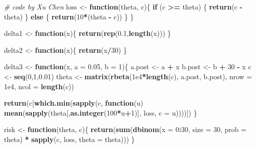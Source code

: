 \documentclass[
]{article}
\newenvironment{Shaded}{\begin{snugshade}}{\end{snugshade}}
\newcommand{\CommentTok}[1]{\textcolor[rgb]{0.56,0.35,0.01}{\textit{#1}}}
\newcommand{\ControlFlowTok}[1]{\textcolor[rgb]{0.13,0.29,0.53}{\textbf{#1}}}
\newcommand{\DataTypeTok}[1]{\textcolor[rgb]{0.13,0.29,0.53}{#1}}
\newcommand{\DecValTok}[1]{\textcolor[rgb]{0.00,0.00,0.81}{#1}}
\newcommand{\FloatTok}[1]{\textcolor[rgb]{0.00,0.00,0.81}{#1}}
\newcommand{\KeywordTok}[1]{\textcolor[rgb]{0.13,0.29,0.53}{\textbf{#1}}}
\newcommand{\NormalTok}[1]{#1}
\newcommand{\OperatorTok}[1]{\textcolor[rgb]{0.81,0.36,0.00}{\textbf{#1}}}
\newcommand{\StringTok}[1]{\textcolor[rgb]{0.31,0.60,0.02}{#1}}
\begin{document}
\begin{Shaded}
\begin{Highlighting}[]
\CommentTok{# code by Xu Chen}
\NormalTok{loss <-}\StringTok{ }\ControlFlowTok{function}\NormalTok{(theta, c)\{}
  \ControlFlowTok{if}\NormalTok{ (c }\OperatorTok{>=}\StringTok{ }\NormalTok{theta) \{}
    \KeywordTok{return}\NormalTok{(c }\OperatorTok{-}\StringTok{ }\NormalTok{theta)}
\NormalTok{  \} }\ControlFlowTok{else}\NormalTok{ \{}
    \KeywordTok{return}\NormalTok{(}\DecValTok{10}\OperatorTok{*}\NormalTok{(theta }\OperatorTok{-}\StringTok{ }\NormalTok{c))}
\NormalTok{  \}}
\NormalTok{\}}


\NormalTok{delta1 <-}\StringTok{ }\ControlFlowTok{function}\NormalTok{(x)\{}
  \KeywordTok{return}\NormalTok{(}\KeywordTok{rep}\NormalTok{(}\FloatTok{0.1}\NormalTok{,}\KeywordTok{length}\NormalTok{(x)))}
\NormalTok{\}}


\NormalTok{delta2 <-}\StringTok{ }\ControlFlowTok{function}\NormalTok{(x)\{}
  \KeywordTok{return}\NormalTok{(x}\OperatorTok{/}\DecValTok{30}\NormalTok{)}
\NormalTok{\}}


\NormalTok{delta3 <-}\StringTok{ }\ControlFlowTok{function}\NormalTok{(x, }\DataTypeTok{a =} \FloatTok{0.05}\NormalTok{, }\DataTypeTok{b =} \DecValTok{1}\NormalTok{)\{}
\NormalTok{  a.post <-}\StringTok{ }\NormalTok{a }\OperatorTok{+}\StringTok{ }\NormalTok{x}
\NormalTok{  b.post <-}\StringTok{ }\NormalTok{b }\OperatorTok{+}\StringTok{ }\DecValTok{30} \OperatorTok{-}\StringTok{ }\NormalTok{x}
\NormalTok{  c <-}\StringTok{ }\KeywordTok{seq}\NormalTok{(}\DecValTok{0}\NormalTok{,}\DecValTok{1}\NormalTok{,}\FloatTok{0.01}\NormalTok{)}
\NormalTok{  theta <-}\StringTok{ }\KeywordTok{matrix}\NormalTok{(}\KeywordTok{rbeta}\NormalTok{(}\FloatTok{1e4}\OperatorTok{*}\KeywordTok{length}\NormalTok{(c), a.post, b.post), }
                  \DataTypeTok{nrow =} \FloatTok{1e4}\NormalTok{, }\DataTypeTok{ncol =} \KeywordTok{length}\NormalTok{(c))}
  
  \KeywordTok{return}\NormalTok{(c[}\KeywordTok{which.min}\NormalTok{(}\KeywordTok{sapply}\NormalTok{(c, }\ControlFlowTok{function}\NormalTok{(u) }\KeywordTok{mean}\NormalTok{(}\KeywordTok{sapply}\NormalTok{(theta[,}\KeywordTok{as.integer}\NormalTok{(}\DecValTok{100}\OperatorTok{*}\NormalTok{u}\OperatorTok{+}\DecValTok{1}\NormalTok{)], loss, }\DataTypeTok{c =}\NormalTok{ u))))])}
\NormalTok{\}}

\NormalTok{risk <-}\StringTok{ }\ControlFlowTok{function}\NormalTok{(theta, c)\{}
  \KeywordTok{return}\NormalTok{(}\KeywordTok{sum}\NormalTok{(}\KeywordTok{dbinom}\NormalTok{(}\DataTypeTok{x =} \DecValTok{0}\OperatorTok{:}\DecValTok{30}\NormalTok{, }\DataTypeTok{size =} \DecValTok{30}\NormalTok{, }\DataTypeTok{prob =}\NormalTok{ theta) }\OperatorTok{*}\StringTok{ }\KeywordTok{sapply}\NormalTok{(c, loss, }\DataTypeTok{theta =}\NormalTok{ theta)))}
\NormalTok{\}}



\end{Highlighting}
\end{Shaded}
\end{document}

